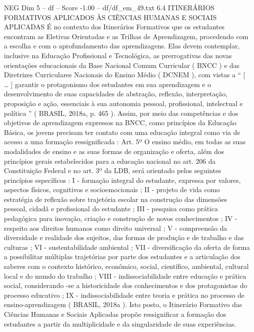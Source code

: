\begin{textsample}{NEG Dim 5 – df – Score -1.00 – df/df\_em\_49.txt}  \label{ex:f5_neg_133}
6.4 ITINERÁRIOS FORMATIVOS APLICADOS ÀS CIÊNCIAS HUMANAS E SOCIAIS APLICADAS É no contexto dos Itinerários Formativos que os estudantes encontram as Eletivas Orientadas e as Trilhas de Aprendizagem, procedendo com a escolha e com o aprofundamento das aprendizagens.
Elas devem contemplar, inclusive na Educação Profissional e Tecnológica, as prerrogativas das novas orientações educacionais da Base Nacional Comum Curricular ( BNCC ) e das Diretrizes Curriculares Nacionais do Ensino Médio ( DCNEM ), com vistas a “ [ … ] garantir o protagonismo dos estudantes em sua aprendizagem e o desenvolvimento de suas capacidades de abstração, reflexão, interpretação, proposição e ação, essenciais à sua autonomia pessoal, profissional, intelectual e política ” ( BRASIL, 2018a, p. 465 ).
Assim, por meio das competências e dos objetivos de aprendizagem expressos na BNCC, como princípios da Educação Básica, os jovens precisam ter contato com uma educação integral como via de acesso a uma formação ressignificada : Art. 5º O ensino médio, em todas as suas modalidades de ensino e as suas formas de organização e oferta, além dos princípios gerais estabelecidos para a educação nacional no art. 206 da Constituição Federal e no art. 3º da LDB, será orientado pelos seguintes princípios específicos : I - formação integral do estudante, expressa por valores, aspectos físicos, cognitivos e socioemocionais ; II - projeto de vida como estratégia de reflexão sobre trajetória escolar na construção das dimensões pessoal, cidadã e profissional do estudante ; III - pesquisa como prática pedagógica para inovação, criação e construção de novos conhecimentos ; IV - respeito aos direitos humanos como direito universal ; V - compreensão da diversidade e realidade dos sujeitos, das formas de produção e de trabalho e das culturas ; VI - sustentabilidade ambiental ; VII - diversificação da oferta de forma a possibilitar múltiplas trajetórias por parte dos estudantes e a articulação dos saberes com o contexto histórico, econômico, social, científico, ambiental, cultural local e do mundo do trabalho ; VIII - indissociabilidade entre educação e prática social, considerando -se a historicidade dos conhecimentos e dos protagonistas do processo educativo ; IX - indissociabilidade entre teoria e prática no processo de ensino-aprendizagem ( BRASIL, 2018a ).
Isto posto, o Itinerário Formativo das Ciências Humanas e Sociais Aplicadas propõe ressignificar a formação dos estudantes a partir da multiplicidade e da singularidade de suas experiências.

\end{textsample}
